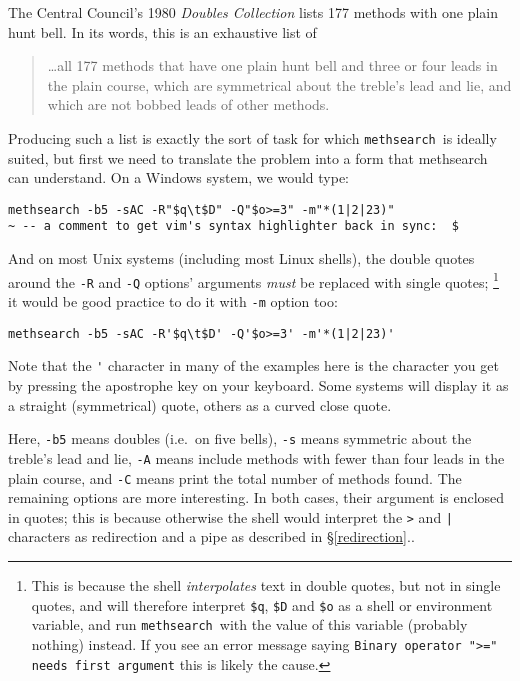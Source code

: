\documentclass[a4paper,11pt,oneside]{book}
\makeatletter
\newcommand{\oi}[1]{\index{#1@{\hspace*{-\optwidth}\texttt{-}\texttt{#1}}}}
\def\methsearch{\texttt{meth\-search}}
\newcommand{\sref}[1]{\hyperref[#1]{\S\ref{#1}}}
\makeatother
\begin{document}
The Central Council's 1980 \textit{Doubles Collection}%
lists 177 methods with one plain hunt bell.  
In its words, this is an exhaustive list of 
\begin{quote}
\ldots all 177 methods that have one plain hunt bell and three or four leads in
the plain course, which are symmetrical about the treble's lead and lie,
and which are not bobbed leads of other methods.
\end{quote}
Producing such a list is exactly the sort of task for which 
\methsearch\ is ideally suited, but first we need to translate the problem
into a form that methsearch can understand.  On a Windows system, we would
type:
\begin{Verbatim}[commentchar=~]
methsearch -b5 -sAC -R"$q\t$D" -Q"$o>=3" -m"*(1|2|23)"
~ -- a comment to get vim's syntax highlighter back in sync:  $
\end{Verbatim}
And on most Unix systems (including most Linux shells), 
the double quotes around the \verb+-R+ and \verb+-Q+ options' arguments 
\textit{must} be replaced with single quotes;%
\footnote{This is because the shell 
\textit{interpolates} text in double quotes,
but not in single quotes,  and will therefore interpret 
\verb+$q+, \verb+$D+ and \verb+$o+ as a shell or environment variable, and 
run \methsearch\ with the value of this variable (probably nothing) instead.
If you see an error message saying 
\texttt{Binary operator ">=" needs first argument}
this is likely the cause.}
it would be good practice to do it with \verb+-m+ option too:
\begin{Verbatim}[commentchar=~]
methsearch -b5 -sAC -R'$q\t$D' -Q'$o>=3' -m'*(1|2|23)'
\end{Verbatim}
Note that the \verb+'+ character in many of the examples here is the character
you get by pressing the apostrophe key on your keyboard.  Some systems will
display it as a straight (symmetrical) quote, others as a curved close quote.

Here, \verb+-b5+ means doubles (i.e.\ on five bells), \verb+-s+ means 
symmetric about the treble's lead and lie, \verb+-A+ means include methods
with fewer than four leads in the plain course,\oi{A} 
and \verb+-C+ means print the total number of methods found.\oi{C}
The remaining options are more interesting.  In both cases, their argument
is enclosed in quotes;  this is because otherwise the shell would interpret
the \verb+>+ and \verb+|+ characters as redirection and a pipe as described
in \sref{redirection}..
\end{document}

